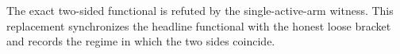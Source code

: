 The exact two-sided functional is refuted by the single-active-arm witness.  This replacement synchronizes the headline functional with the honest loose bracket and records the regime in which the two sides coincide.
